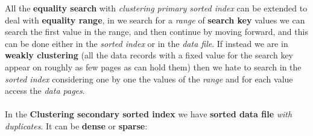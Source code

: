 \documentclass{article}
\begin{document}
All the \textbf{equality search} with \emph{clustering primary sorted index} can be extended to deal with \textbf{equality range}, in we search for a \emph{range} of \textbf{search key} values we can search the first value in the range, and then continue by moving forward, and this can be done either in the \emph{sorted index} or in the \emph{data file}. If instead we are in \textbf{weakly clustering} (all the data records with a fixed value for the search key appear on roughly as few pages as can hold them) then we hate to search in the \emph{sorted index} considering one by one the values of the \emph{range} and for each value access the \emph{data pages}. \\\\
In the \textbf{Clustering secondary sorted index} we have \textbf{sorted data file}\emph{ with duplicates}. It can be \textbf{dense} or \textbf{sparse}:
\end{document}
